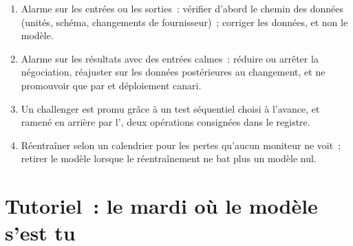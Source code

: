 \begin{method}\label{met:ml:mon:after}
\begin{enumerate}
\item Alarme sur les entrées ou les sorties~: vérifier d'abord le chemin des données (unités, schéma, changements de fournisseur)~; corriger les données, et non le modèle.
\item Alarme sur les résultats avec des entrées calmes~: réduire ou arrêter la négociation, réajuster sur les données postérieures au changement, et ne promouvoir que par  et
déploiement canari.
\item Un challenger est promu grâce à un test séquentiel choisi à l'avance, et ramené en arrière par l', deux opérations consignées dans
le registre.
\item Réentraîner selon un calendrier pour les pertes qu'aucun moniteur ne voit~; retirer le modèle lorsque le réentraînement ne bat plus un modèle nul.
\end{enumerate}
\end{method}

\section{Tutoriel~: le mardi où le modèle s'est tu}\label{tut:ml:monitoring-and-retraining:tut}

